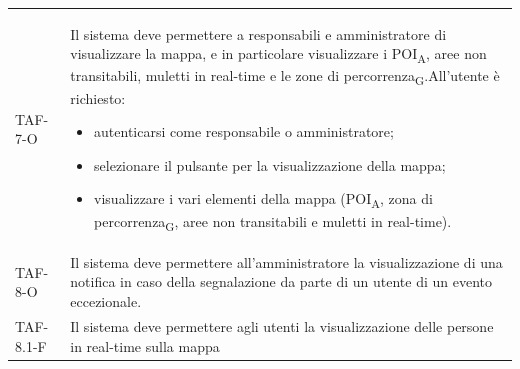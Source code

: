 \begin{longtable}{ >{\centering}p{} >{}p{}}
	TAF-7-O & Il sistema deve permettere a responsabili e amministratore di visualizzare la mappa, e in particolare visualizzare i POI\textsubscript{A}, aree non transitabili, muletti in real-time e le zone di percorrenza\textsubscript{G}.\newline All'utente è richiesto:\begin{itemize} \item autenticarsi come responsabile o amministratore; \item selezionare il pulsante per la visualizzazione della mappa; \item visualizzare i vari elementi della mappa (POI\textsubscript{A}, zona di percorrenza\textsubscript{G}, aree non transitabili e muletti in real-time). \end{itemize}\tabularnewline

	TAF-8-O & Il sistema deve permettere all'amministratore la visualizzazione di una notifica in caso della segnalazione da parte di un utente di un evento eccezionale.\tabularnewline

	TAF-8.1-F & Il sistema deve permettere agli utenti la visualizzazione delle persone in real-time sulla mappa\tabularnewline


\end{longtable}
